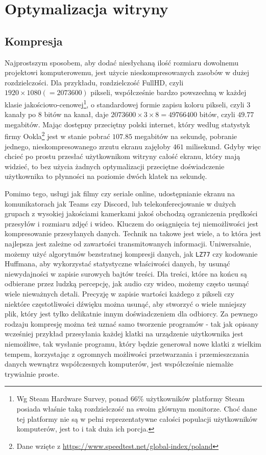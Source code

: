 \documentclass[licencjacka]{pracadypl}
\begin{document}
\chapter{Optymalizacja witryny}
\section{Kompresja}
Najprostszym sposobem, aby dodać niesłychaną ilość rozmiaru dowolnemu projektowi komputerowemu, jest użycie nieskompresowanych zasobów w dużej rozdzielczości. Dla przykładu, rozdzielczość FullHD, czyli $1920\times1080\left(=2073600\right)$ pikseli, współcześnie bardzo powszechną w każdej klasie jakościowo-cenowej\footnote{Wg Steam Hardware Survey, ponad 66\% użytkowników platformy Steam posiada właśnie taką rozdzielczość na swoim głównym monitorze. Choć dane tej platformy nie są w pełni reprezentatywne całości populacji użytkowników komputerów, jest to i tak duża ich porcja.}, o standardowej formie zapisu koloru pikseli, czyli 3 kanały po 8 bitów na kanał, daje $2073600\times3\times8 = 49766400$ bitów, czyli $49.77$ megabitów. Mając dostępny przeciętny polski internet, który według statystyk firmy Ookla\footnote{Dane wzięte z \url{https://www.speedtest.net/global-index/poland}} jest w stanie pobrać $107.85$ megabitów na sekundę, pobranie jednego, nieskompresowanego zrzutu ekranu zajęłoby $461$ milisekund. Gdyby więc chcieć po prostu przesłać użytkownikom witryny całość ekranu, który mają widzieć, to bez użycia żadnych optymalizacji przeciętne doświadczenie użytkownika to płynności na poziomie dwóch klatek na sekundę.

Pomimo tego, usługi jak filmy czy seriale online, udostępnianie ekranu na komunikatorach jak Teams czy Discord, lub telekonferecjowanie w dużych grupach z wysokiej jakościami kamerkami jakoś obchodzą ograniczenia prędkości przesyłów i rozmiaru zdjęć i wideo. 
Kluczem do osiągnięcia tej niemożliwości jest kompresowanie przesyłanych danych. Technik na takowe jest wiele, a to która jest najlepsza jest zależne od zawartości transmitowanych informacji. Uniwersalnie, możemy użyć algorytmów bezstratnej kompresji danych, jak \texttt{LZ77} czy kodowanie Huffmana, aby wykorzystać statystyczne właściwości danych, by usunąć niewydajności w zapisie surowych bajtów treści. Dla treści, które na końcu są odbierane przez ludzką percepcję, jak audio czy wideo, możemy często usunąć wiele nieważnych detali. Precyzję w zapisie wartości każdego z pikseli czy niektóre częstotliwości dźwięku można usunąć, aby stworzyć o wiele mniejszy plik, który jest tylko delikatnie innym doświadczeniem dla odbiorcy. Za pewnego rodzaju kompresję można też uznać samo tworzenie programów - tak jak opisany wcześniej przykład przesyłania każdej klatki na urządzenie użytkownika jest niemożliwe, tak wysłanie programu, który będzie generował nowe klatki z wielkim tempem, korzystając z ogromnych możliwości przetwarzania i przemieszczania danych wewnątrz współczesnych komputerów, jest współcześnie niemalże trywialnie proste.
\end{document}
